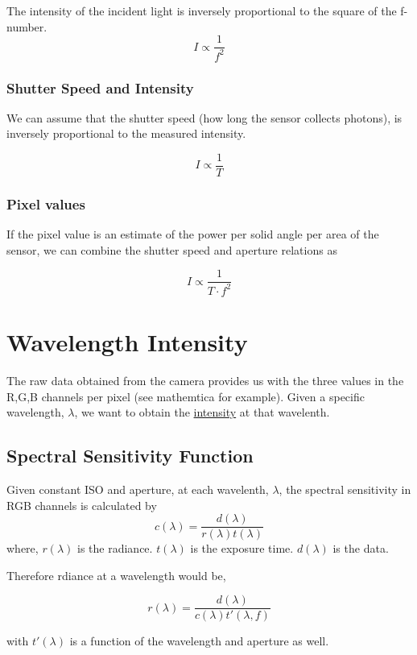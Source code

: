 \documentclass{article}
\begin{document}
The intensity of the incident light is inversely proportional to the square of the
f-number.
$$ I \propto \frac{1}{f^2} $$

\subsubsection{Shutter Speed and Intensity}
We can assume that the shutter speed (how long the sensor collects photons), is inversely proportional
to the measured intensity.

$$ I \propto \frac{1}{T}$$

\subsubsection{Pixel values}

If the pixel value is an estimate of the power per solid angle per area of the sensor, we can combine the
shutter speed and aperture relations as

$$ I \propto \frac{1}{T \cdot f^2}$$
\section{Wavelength Intensity}

The raw data obtained from the camera provides us with the three values in the
R,G,B channels per pixel (see mathemtica for example). Given a specific wavelength, $ \lambda$, we want to obtain the
\underline{intensity} at that wavelenth.

\subsection{Spectral Sensitivity Function}

Given constant ISO and aperture, at each wavelenth, $ \lambda$, the spectral sensitivity
in RGB channels is calculated by
$$ c(\lambda) = \frac{d(\lambda)}{r(\lambda) t(\lambda)} $$
where, $ r(\lambda)$ is the radiance. $t(\lambda) $ is the exposure time.
$d(\lambda)$ is the data.

Therefore rdiance at a wavelength would be,

$$ r(\lambda) = \frac{d(\lambda)}{c(\lambda)t'(\lambda, f)} $$

with $t'(\lambda) $ is a function of the wavelength and aperture as well.
\end{document}
